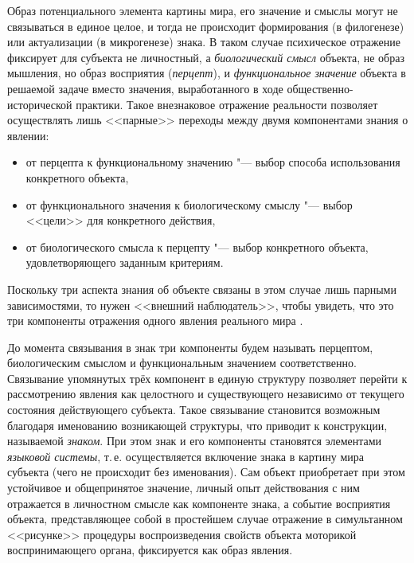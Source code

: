 Образ потенциального элемента картины мира, его значение и смыслы могут не связываться в единое целое, и тогда не происходит формирования (в филогенезе) или актуализации (в микрогенезе) знака. В таком случае психическое отражение фиксирует для субъекта не личностный, а \textit{биологический смысл} объекта, не образ мышления, но образ восприятия (\textit{перцепт}), и \textit{функциональное значение} объекта в решаемой задаче вместо значения, выработанного в ходе общественно-исторической практики. Такое внезнаковое отражение реальности позволяет осуществлять лишь <<парные>> переходы между двумя компонентами знания о явлении: 
\begin{itemize}
	\item от перцепта к функциональному значению "--- выбор способа использования конкретного объекта, 
	\item от функционального значения к биологическому смыслу "--- выбор <<цели>> для конкретного действия, 
	\item от биологического смысла к перцепту "--- выбор конкретного объекта, удовлетворяющего заданным критериям.
\end{itemize}
Поскольку три аспекта знания об объекте связаны в этом случае лишь парными зависимостями, то нужен <<внешний наблюдатель>>, чтобы увидеть, что это три компоненты отражения одного явления реального мира \cite{Chudova2012}.

До момента связывания в знак три компоненты будем называть перцептом, биологическим смыслом и функциональным значением соответственно. Связывание упомянутых трёх компонент в единую структуру позволяет перейти к рассмотрению явления как целостного и существующего независимо от текущего состояния действующего субъекта. Такое связывание становится возможным благодаря именованию возникающей структуры, что приводит к конструкции, называемой \textit{знаком}. При этом знак и его компоненты становятся элементами \textit{языковой системы}, т.\,е. осуществляется включение знака в картину мира субъекта (чего не происходит без именования). Сам объект приобретает при этом устойчивое и общепринятое значение, личный опыт действования с ним отражается в личностном смысле как компоненте знака, а событие восприятия объекта, представляющее собой в простейшем случае отражение в симультанном <<рисунке>> процедуры воспроизведения свойств объекта моторикой воспринимающего органа, фиксируется как образ явления.


